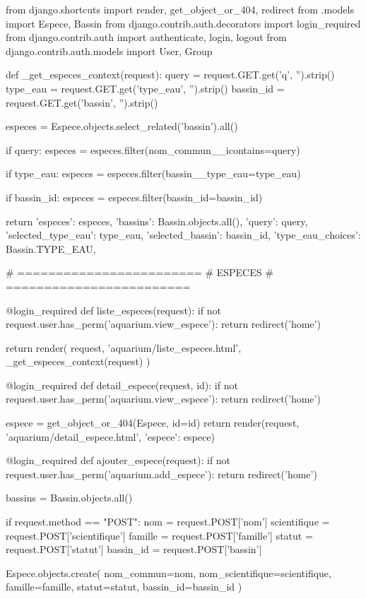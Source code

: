 from django.shortcuts import render, get_object_or_404, redirect
from .models import Espece, Bassin
from django.contrib.auth.decorators import login_required
from django.contrib.auth import authenticate, login, logout
from django.contrib.auth.models import User, Group


def _get_especes_context(request):
    query = request.GET.get('q', '').strip()
    type_eau = request.GET.get('type_eau', '').strip()
    bassin_id = request.GET.get('bassin', '').strip()

    especes = Espece.objects.select_related('bassin').all()

    if query:
        especes = especes.filter(nom_commun__icontains=query)

    if type_eau:
        especes = especes.filter(bassin__type_eau=type_eau)

    if bassin_id:
        especes = especes.filter(bassin_id=bassin_id)

    return {
        'especes': especes,
        'bassins': Bassin.objects.all(),
        'query': query,
        'selected_type_eau': type_eau,
        'selected_bassin': bassin_id,
        'type_eau_choices': Bassin.TYPE_EAU,
    }


# ========================
# ESPECES
# ========================

@login_required
def liste_especes(request):
    if not request.user.has_perm('aquarium.view_espece'):
        return redirect('home')

    return render(
        request,
        'aquarium/liste_especes.html',
        _get_especes_context(request)
    )


@login_required
def detail_espece(request, id):
    if not request.user.has_perm('aquarium.view_espece'):
        return redirect('home')

    espece = get_object_or_404(Espece, id=id)
    return render(request, 'aquarium/detail_espece.html', {'espece': espece})


@login_required
def ajouter_espece(request):
    if not request.user.has_perm('aquarium.add_espece'):
        return redirect('home')

    bassins = Bassin.objects.all()

    if request.method == "POST":
        nom = request.POST['nom']
        scientifique = request.POST['scientifique']
        famille = request.POST['famille']
        statut = request.POST['statut']
        bassin_id = request.POST['bassin']

        Espece.objects.create(
            nom_commun=nom,
            nom_scientifique=scientifique,
            famille=famille,
            statut=statut,
            bassin_id=bassin_id
        )

